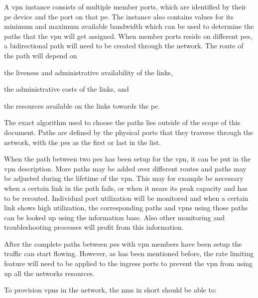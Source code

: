 A \ac{vpn} instance consists of multiple member ports, which are identified by their \ac{pe} device and the port on that \ac{pe}. The instance also contains values for its minimum and maximum available bandwidth which can be used to determine the paths that the \ac{vpn} will get assigned. When member ports reside on different \acp{pe}, a bidirectional path will need to be created through the network. The route of the path will depend on 
\begin{inparaenum}
	\item the liveness and administrative availability of the links, 
	\item the administrative costs of the links, and 
	\item the resources available on the links towards the \ac{pe}.
\end{inparaenum}
The exact algorithm used to choose the paths lies outside of the scope of this document. Paths are defined by the physical ports that they traverse through the network, with the \acp{pe} as the first or last in the list.

When the path between two \acp{pe} has been setup for the \ac{vpn}, it can be put in the \ac{vpn} description. More paths may be added over different routes and paths may be adjusted during the lifetime of the \ac{vpn}. This may for example be necessary when a certain link in the path fails, or when it nears its peak capacity and has to be rerouted. 
Individual port utilization will be monitored and when a certain link shows high utilization, the corresponding paths and \acp{vpn} using those paths can be looked up using the information base. Also other monitoring and troubleshooting processes will profit from this information.


After the complete paths between \acp{pe} with \ac{vpn} members have been setup the traffic can start flowing. However, as has been mentioned before, the rate limiting feature will need to be applied to the ingress ports to prevent the \ac{vpn} from using up all the networks resources. 

To provision \acp{vpn} in the network, the \ac{nms} in short should be able to:

